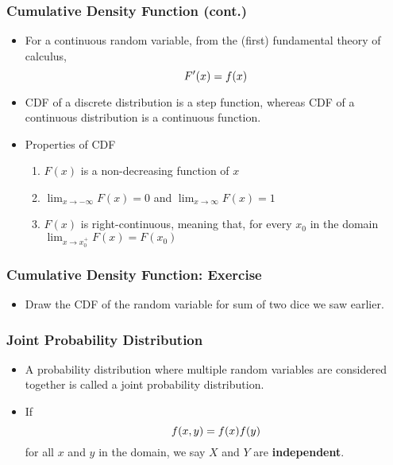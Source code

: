 \documentclass[pdflatex, 12pt]{beamer}
\begin{document}
\begin{frame}
\frametitle{Cumulative Density Function (cont.)}
\begin{itemize}
\item For a continuous random variable, from the (first) fundamental theory of calculus, 
 \begin{equation}
 F'(x) = f(x) \notag
 \end{equation}
\vspace{0.2cm}
\item CDF of a discrete distribution is a step function, whereas CDF of a continuous distribution is a continuous function.
\vspace{0.4cm}
\item Properties of CDF
 \begin{enumerate}
 \item $F(x)$ is a non-decreasing function of $x$
 \item $\lim_{x \to -\infty} F(x) = 0$ and $\lim_{x \to \infty} F(x) = 1$
 \item $F(x)$ is right-continuous, meaning that, for every $x_0$ in the domain $\lim_{x \to x_0^{+}} F(x) = F(x_0)$
 \end{enumerate}
\end{itemize}
\end{frame}

\begin{frame}
\frametitle{Cumulative Density Function: Exercise}
\begin{itemize}
\item Draw the CDF of the random variable for sum of two dice we saw earlier.
\end{itemize}
\end{frame}

\begin{frame}
\frametitle{Joint Probability Distribution}
\begin{itemize}
\item A probability distribution where multiple random variables are considered together is called a joint probability distribution.
\vspace{0.4cm}
\item If
 \begin{equation}
 f(x, y) = f(x)f(y) \notag 
 \end{equation}
for all $x$ and $y$ in the domain, we say $X$ and $Y$ are \textbf{independent}.
\end{itemize}
\end{frame}
\end{document}

